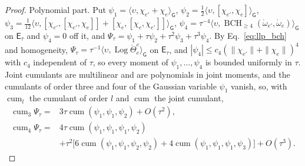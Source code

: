 \begin{proof}
Polynomial part. Put $\psi_1=\langle\upsilon,\chi_{e'}+\chi_e\rangle_{\mathsf G}$, $\psi_2=\frac12\langle\upsilon,[\chi_{e'},\chi_e]\rangle_{\mathsf G}$, $\psi_3=\frac1{12}\langle\upsilon,[\chi_{e'},[\chi_{e'},\chi_e]]+[\chi_e,[\chi_e,\chi_{e'}]]\rangle_{\mathsf G}$, $\psi_4=\tau^{-4}\langle\upsilon,\operatorname{BCH}_{\geq4}(\mathring\omega_{e'},\mathring\omega_e)\rangle_{\mathsf G}$ on $\mathsf E_\tau$ and $\psi_4=0$ off it, and $\Psi_\tau=\psi_1+\tau\psi_2+\tau^2\psi_3+\tau^3\psi_4$. By Eq.~\eqref{eq:llp_bch} and homogeneity, $\Psi_\tau=\tau^{-1}\langle\upsilon,\operatorname{Log}\mathring\Theta^c_e\rangle_{\mathsf G}$ on $\mathsf E_\tau$, and $|\psi_4|\leq c_4(\|\chi_{e'}\|+\|\chi_e\|)^4$ with $c_4$ independent of $\tau$, so every moment of $\psi_1,\ldots,\psi_4$ is bounded uniformly in $\tau$. Joint cumulants are multilinear and are polynomials in joint moments, and the cumulants of order three and four of the Gaussian variable $\psi_1$ vanish, so, with $\operatorname{cum}_l$ the cumulant of order $l$ and $\operatorname{cum}$ the joint cumulant,
\begin{equation}
\begin{aligned}
\operatorname{cum}_3\Psi_\tau={}&3\tau\operatorname{cum}(\psi_1,\psi_1,\psi_2)+O(\tau^2),\\
\operatorname{cum}_4\Psi_\tau={}&4\tau\operatorname{cum}(\psi_1,\psi_1,\psi_1,\psi_2)\\
&+\tau^2\bigl[6\operatorname{cum}(\psi_1,\psi_1,\psi_2,\psi_2)+4\operatorname{cum}(\psi_1,\psi_1,\psi_1,\psi_3)\bigr]+O(\tau^3).
\end{aligned}
\label{eq:llp_cumulant_expansion}
\end{equation}


\end{proof}
